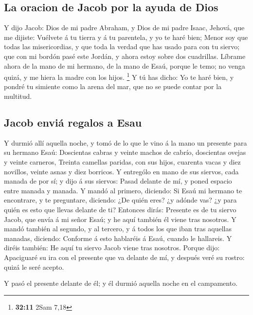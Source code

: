 \hypertarget{la-oracion-de-jacob-por-la-ayuda-de-dios}{%
\subsection{La oracion de Jacob por la ayuda de
Dios}\label{la-oracion-de-jacob-por-la-ayuda-de-dios}}

 Y dijo Jacob: Dios de mi padre Abraham, y Dios de mi
padre Isaac, Jehová, que me dijiste: Vuélvete á tu tierra y á tu
parentela, y yo te haré bien;  Menor soy que todas las
misericordias, y que toda la verdad que has usado para con tu siervo;
que con mi bordón pasé este Jordán, y ahora estoy sobre dos cuadrillas.
 Líbrame ahora de la mano de mi hermano, de la mano de
Esaú, porque le temo; no venga quizá, y me hiera la madre con los hijos.
\footnote{\textbf{32:11} 2Sam 7,18}  Y tú has dicho: Yo
te haré bien, y pondré tu simiente como la arena del mar, que no se
puede contar por la multitud.

\hypertarget{jacob-enviuxe1-regalos-a-esau}{%
\subsection{Jacob enviá regalos a
Esau}\label{jacob-enviuxe1-regalos-a-esau}}

 Y durmió allí aquella noche, y tomó de lo que le vino á
la mano un presente para su hermano Esaú:  Doscientas
cabras y veinte machos de cabrío, doscientas ovejas y veinte carneros,
 Treinta camellas paridas, con sus hijos, cuarenta vacas
y diez novillos, veinte asnas y diez borricos.  Y
entrególo en mano de sus siervos, cada manada de por sí; y dijo á sus
siervos: Pasad delante de mí, y poned espacio entre manada y manada.
 Y mandó al primero, diciendo: Si Esaú mi hermano te
encontrare, y te preguntare, diciendo: ¿De quién eres? ¿y adónde vas? ¿y
para quién es esto que llevas delante de ti?  Entonces
dirás: Presente es de tu siervo Jacob, que envía á mi señor Esaú; y he
aquí también él viene tras nosotros.  Y mandó también al
segundo, y al tercero, y á todos los que iban tras aquellas manadas,
diciendo: Conforme á esto hablaréis á Esaú, cuando le hallareis.
 Y diréis también: He aquí tu siervo Jacob viene tras
nosotros. Porque dijo: Apaciguaré su ira con el presente que va delante
de mí, y después veré su rostro: quizá le seré acepto.

 Y pasó el presente delante de él; y él durmió aquella
noche en el campamento.

